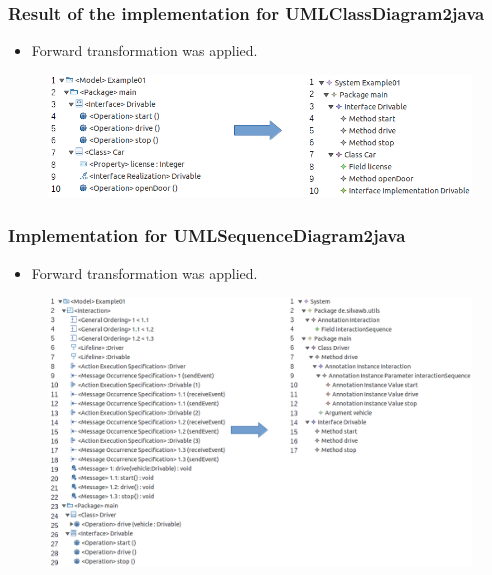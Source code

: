 \documentclass{beamer}
\begin{document}
\begin{frame}[t]
	\frametitle{Result of the implementation for UMLClassDiagram2java}
	\begin{itemize}
		\item Forward transformation was applied.
	\end{itemize}
	\begin{figure}
		\includegraphics[width=\textwidth]{umlClassDiagram2java_Example01}
	\end{figure}
\end{frame}

\begin{frame}[t]
	\frametitle{Implementation for UMLSequenceDiagram2java}	
	\vskip -10pt
	\begin{itemize}
		\item Forward transformation was applied.
	\end{itemize}
	\begin{figure}
		\includegraphics[width=.9\textwidth]{umlSequenceDiagram2java_Example01}
	\end{figure}
\end{frame}
\end{document}

